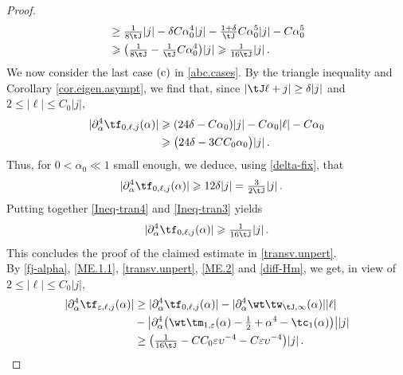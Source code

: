 \documentclass[a4paper,reqno,10pt]{article}
\newcommand{\pa}{\partial}
\begin{document}
\begin{proof}
\begin{align}
            & \geq \tfrac{1}{8\tJ}|j| - \delta C\alpha_{0}^4 |j| - \tfrac{1+\delta}{\tJ} C\alpha_{0}^5 |j| - C \alpha_{0}^5 \\
            &\geqslant\big(\tfrac{1}{8\tJ}- \tfrac{1}{\tJ}C\alpha_{0}^4\big)|j| \geqslant\tfrac{1}{16\tJ}|j| \,. \label{Ineq-tran4}
	\end{align}
    We now consider the last case $({\rm c})$ in \eqref{abc.cases}. By the triangle inequality and Corollary \ref{cor.eigen.asympt},
  we  find  that, since  $|\tJ\ell+j|\geq \delta |j|$ and $2\leqslant |\ell|\leqslant C_0|j|$,
    \begin{align*}
		|\pa_{\alpha}^4\tf_{0,\ell,j}(\alpha)| &\geqslant ( 24 \delta-C\alpha_{0}) |j|-C\alpha_{0} |\ell|-C\alpha_{0} \\
         &\geqslant \big( 24 \delta-3C C_0\alpha_{0}\big) |j|\,.
\end{align*}
Thus, for $0<\alpha_{0}\ll 1$ small enough, we deduce, using \eqref{delta-fix}, that
\begin{align}\label{Ineq-tran3}
		|\pa_{\alpha}^4\tf_{0,\ell,j}(\alpha)| 
         &\geqslant 12 \delta |j|=\tfrac{3}{2\tJ}|j|\,.
\end{align}
 Putting together \eqref{Ineq-tran4} and \eqref{Ineq-tran3}  yields
 \begin{align}
        |\pa_{\alpha}^4 \tf_{0,\ell,j}(\alpha)| 
         \geqslant \tfrac{1}{16\tJ}|j|\,.
\end{align}
This concludes the proof of the claimed estimate in \eqref{transv.unpert}.
\\[1mm]
     By \eqref{fj-alpha}, \eqref{ME.1.1}, \eqref{transv.unpert}, \eqref{ME.2} and \eqref{diff-Hm}, we get, in view of $2\leqslant|\ell|\leqslant C_0|j|,$ 
	\begin{align}
            |\pa_{\alpha}^4\tf_{\varepsilon,\ell,j}(\alpha)|& \geq 
            |\pa_{\alpha}^4 \tf_{0,\ell,j}(\alpha)| - 
            |\pa_{\alpha}^4 \wt\tw_{\tJ,\infty}(\alpha)| |\ell| \\&-
            \big| \pa_{\alpha}^4 \big( \wt\tm_{1,\varepsilon}(\alpha) - \tfrac12 + \alpha^4 - \tc_{1}(\alpha) \big) \big| |j| \\
			& \geq \big(\tfrac{1}{16\tJ}   - C C_0 \varepsilon \upsilon^{-4}  - C \varepsilon \upsilon^{-4}  \big) |j|\,.

\end{align}
\end{proof}
\end{document}
